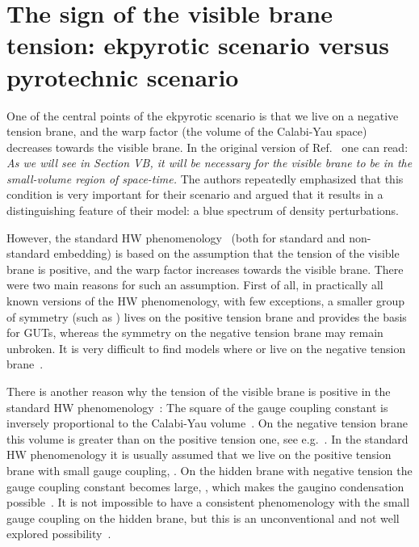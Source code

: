 \documentclass[a4paper,12pt]{article}
\begin{document}
\section{The sign of the visible brane tension: ekpyrotic scenario versus pyrotechnic scenario}

One of the central points of the ekpyrotic scenario is that we live on a negative tension brane, and the warp factor (the volume of the Calabi-Yau space) decreases towards the visible brane.
In the original version of Ref.~\cite{KOST} one can read: {\it As we   
will see in Section VB,   it will be   necessary  for the visible brane to   
be in the small-volume region of space-time.}   The authors repeatedly emphasized that this condition is very important for their scenario and argued that it results in a distinguishing feature
of their model: a blue spectrum of density perturbations. 

However, the standard HW phenomenology~\cite{HoravaWitten} (both for standard and non-standard embedding) is based  on the assumption that the tension of the visible brane is positive, and   the warp factor increases towards the visible brane.  There were two main reasons for such an assumption. First of all, in practically all known  versions of the HW phenomenology,  with few exceptions,  a smaller group of symmetry (such as \coordHE{}) lives on the positive tension brane and provides the basis for GUTs, whereas the symmetry \coordHE{} on the negative tension brane may remain unbroken. It is very difficult   to find  models where \coordHE{} or \coordHE{} live on the negative tension brane~\cite{Benakli:1999sy,Donagi:2001fs}.  

There is another reason why the tension of the visible brane is positive in the standard HW phenomenology~\cite{HoravaWitten}:  The square of the gauge coupling constant is inversely proportional to the Calabi-Yau volume~\cite{HoravaWitten}. On the negative tension brane this volume is greater than on the positive tension one, see e.g.~\cite{KOST}. In the standard HW phenomenology it is usually assumed that we live on the positive tension brane with small gauge coupling, \coordHE{}. On the hidden brane with negative tension the gauge coupling constant becomes large, \coordHE{}, which makes the gaugino condensation possible~\cite{HoravaWitten}. It is not  impossible to have a consistent phenomenology with the small gauge coupling on the hidden brane, but this is an unconventional and not well explored possibility~\cite{Benakli:1999sy}.  
 
\end{document}
